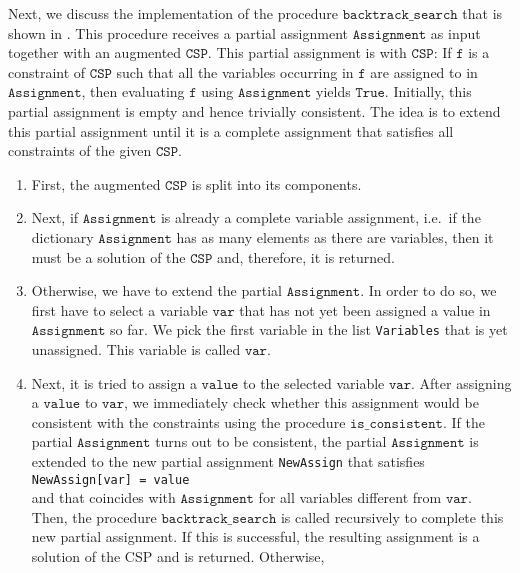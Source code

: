 Next, we discuss the implementation of the procedure $\texttt{backtrack\_search}$ that is shown in
.  This procedure receives a partial assignment 
$\texttt{Assignment}$ as input together with an augmented $\texttt{CSP}$.  This partial assignment is
 with $\texttt{CSP}$:  If $\texttt{f}$ is a constraint of $\texttt{CSP}$ such that
all the variables occurring in $\texttt{f}$ are assigned to in $\texttt{Assignment}$, then evaluating
$\texttt{f}$ using $\texttt{Assignment}$ yields $\texttt{True}$.  Initially, this partial assignment is empty
and hence trivially consistent.  The idea is to extend this partial assignment until it is a complete
assignment that satisfies all constraints of the given $\texttt{CSP}$.
\begin{enumerate}
\item First, the augmented $\texttt{CSP}$ is split into its components.
\item Next, if $\texttt{Assignment}$ is already a complete variable assignment, i.e.~if the dictionary
      $\texttt{Assignment}$ has as many elements as there are variables, then it must be a solution of
      the $\texttt{CSP}$ and, therefore, it is returned.
\item Otherwise, we have to extend the partial $\texttt{Assignment}$.  In order to do so, we first have to
      select a variable $\texttt{var}$ that has not yet been assigned a value in $\texttt{Assignment}$ so far.
      We pick the first variable in the list \texttt{Variables} that is yet unassigned.
      This variable is called $\texttt{var}$.
\item Next, it is tried to assign a $\texttt{value}$ to the selected variable $\texttt{var}$.  After assigning
      a $\texttt{value}$ to $\texttt{var}$, we immediately check whether this assignment would be consistent
      with the constraints using the procedure $\texttt{is\_consistent}$.
      If the partial $\texttt{Assignment}$ turns out to be consistent, the partial $\texttt{Assignment}$
      is extended to the new partial assignment \texttt{NewAssign} that satisfies
      \\[0.2cm]
      \hspace*{1.3cm}
      \texttt{NewAssign[var] = value}
      \\[0.2cm]
      and that coincides with $\texttt{Assignment}$ for all variables different from $\texttt{var}$.
      Then, the procedure $\texttt{backtrack\_search}$ is called recursively to complete this new partial assignment.
      If this is successful, the resulting assignment is a solution of the CSP and is returned.  Otherwise,

\end{enumerate}
